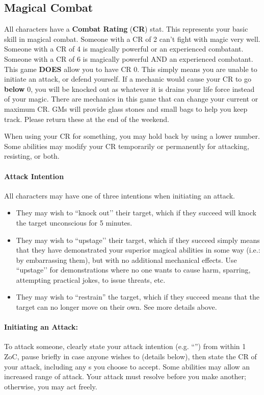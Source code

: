 \documentclass[sheet]{GL2020}
\begin{document}
\subsection{Magical Combat}
All characters have a {\bf Combat Rating} ({\bf CR}) stat. This represents your basic skill in magical combat. Someone with a CR of 2 can't fight with magic very well. Someone with a CR of 4 is magically powerful or an experienced combatant. Someone with a CR of 6 is magically powerful AND an experienced combatant. This game \textbf{DOES} allow you to have CR 0. This simply means you are unable to initiate an attack, or defend yourself. If a mechanic would cause your CR to go \textbf{below} 0, you will be knocked out as whatever it is drains your life force instead of your magic. There are mechanics in this game that can change your current or maximum CR. GMs will provide glass stones and small bags to help you keep track. Please return these at the end of the weekend.

When using your CR for something, you may hold back by using a lower number. Some abilities may modify your CR temporarily or permanently for attacking, resisting, or both.

\paragraph{Attack Intention} All characters may have one of three intentions when initiating an attack. 
\begin{itemize}
	\item They may wish to ``knock out'’ their target, which if they succeed will knock the target unconscious for 5 minutes. 
	\item They may wish to ``upstage'’ their target, which if they succeed simply means that they have demonstrated your superior magical abilities in some way (i.e.: by embarrassing them), but with no additional mechanical effects. Use ``upstage'’ for demonstrations where no one wants to cause harm, sparring, attempting practical jokes, to issue threats, etc. \
	\item They may wish to ``restrain'' the target, which if they succeed means that the target can no longer move on their own.  See more details above. 
\end{itemize}

\paragraph{Initiating an Attack:} To attack someone, clearly state your attack intention (e.g. ``\aKnockOut{}'') from within 1 ZoC, pause briefly in case anyone wishes to \aAssist{} (details below), then state the CR of your attack, including any \aAssist{}s you choose to accept. Some abilities may allow an increased range of attack. Your attack must resolve before you make another; otherwise, you may act freely. 
\end{document}

